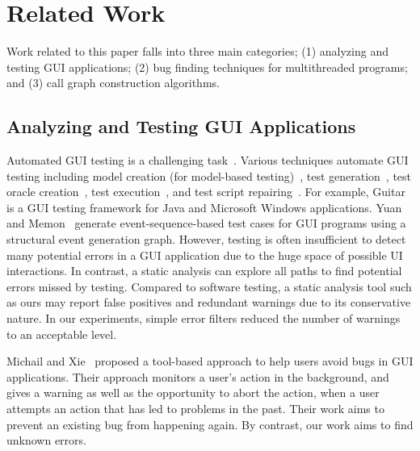 \section{Related Work}

Work related to this paper falls into three main categories; (1)
analyzing and testing GUI applications; (2)
bug finding techniques for multithreaded programs; and (3)
call graph construction algorithms.

\tinystep
\subsection{Analyzing and Testing GUI Applications}

Automated GUI testing is a challenging task~\cite{Bertolino:2007:STR:1253532.1254712,
Harrold:2000:TR:336512.336532}.
Various techniques automate GUI testing including model creation
(for model-based testing)~\cite{androidtesting}, %
test generation~\cite{YuanMemonICSE2007},
test oracle creation~\cite{MemonFSE2000}, test execution~\cite{YuanCohenMemonTSE2011},
and test script repairing~\cite{Huang:2010:RGT:1828417.1828465, Daniel:2011:AGR:2002931.2002937}.
For example,
Guitar~\cite{YuanCohenMemonTSE2011, YuanMemonICSE2007}
is a GUI testing framework for Java and Microsoft Windows applications. 
Yuan and Memon~\cite{YuanMemonICSE2007} generate event-sequence-based test cases for GUI
programs using a structural event generation graph. 
However, testing is often insufficient to detect many potential
errors in a GUI application due to the huge space of possible UI interactions.
In contrast, a static analysis can explore all paths to find potential errors missed by testing.
Compared to software testing, a static analysis tool such as ours may
report false positives and redundant warnings due to its conservative nature.
In our experiments, simple error filters reduced the number of warnings to
an acceptable level.


Michail and Xie~\cite{michail05:helping} proposed a tool-based approach to help users avoid bugs
in GUI applications. Their approach monitors a user's action in the background,
and gives a warning as well as the opportunity to abort the action, when
a user attempts an action that has led to problems in the past. 
Their work aims to prevent an existing bug from happening again.
By contrast, our work aims to find unknown errors.


